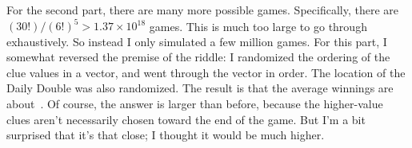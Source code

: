 \documentclass{article}
\begin{document}
For the second part, there are many more possible games.
Specifically, there are $(30!)/(6!)^{5}>1.37\times10^{18}$ games.
This is much too large to go through exhaustively.
So instead I only simulated a few million games.
For this part, I somewhat reversed the premise of the riddle: I randomized the ordering of the clue values in a vector, and went through the vector in order.
The location of the Daily Double was also randomized.
The result is that the average winnings are about
\,.
Of course, the answer is larger than before, because the higher-value clues aren't necessarily chosen toward the end of the game.
But I'm a bit surprised that it's that close; I thought it would be much higher.
\end{document}
